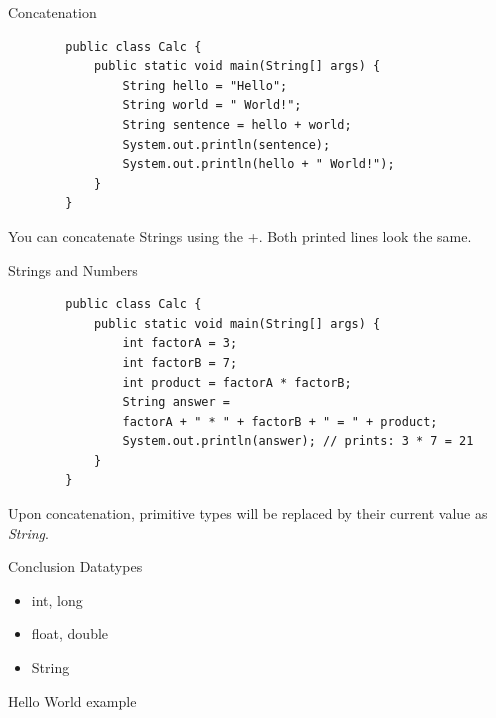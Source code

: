 \begin{frame}[fragile]{Concatenation}
	\begin{lstlisting}
		public class Calc {
			public static void main(String[] args) {
				String hello = "Hello";
				String world = " World!";
				String sentence = hello + world;
				System.out.println(sentence);
				System.out.println(hello + " World!");
			}
		}
	\end{lstlisting}
	You can concatenate Strings using the +. Both printed lines look the same.
\end{frame}

\begin{frame}[fragile]{Strings and Numbers}
	\begin{lstlisting}
		public class Calc {
			public static void main(String[] args) {
				int factorA = 3;
				int factorB = 7;
				int product = factorA * factorB;
				String answer =
				factorA + " * " + factorB + " = " + product;
				System.out.println(answer); // prints: 3 * 7 = 21
			}
		}
	\end{lstlisting}
	Upon concatenation, primitive types will be replaced by their current value as \emph{String}.
\end{frame}

\begin{frame}{Conclusion}
	Datatypes
	\begin{itemize}
		\item int, long
		\item float, double
		\item String
	\end{itemize}
	Hello World example
\end{frame}

